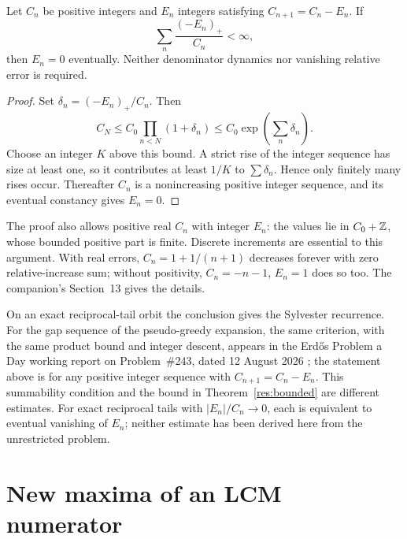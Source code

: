 \documentclass[11pt]{article}
\begin{document}
\begin{theorem}\label{res:massscalar}\label{res:mass}
Let $C_n$ be positive integers and $E_n$ integers satisfying
$C_{n+1}=C_n-E_n$. If
\[
 \sum_n\frac{(-E_n)_+}{C_n}<\infty,
\]
then $E_n=0$ eventually. Neither denominator dynamics nor vanishing relative error is required.
\end{theorem}
\begin{proof}
Set $\delta_n=(-E_n)_+/C_n$. Then
\[
 C_N\le C_0\prod_{n<N}(1+\delta_n)
 \le C_0\exp\!\left(\sum_n\delta_n\right).
\]
Choose an integer $K$ above this bound. A strict rise of the integer
sequence has size at least one, so it contributes at least $1/K$ to
$\sum\delta_n$. Hence only finitely many rises occur. Thereafter
$C_n$ is a nonincreasing positive integer sequence, and its eventual
constancy gives $E_n=0$.
\end{proof}

The proof also allows positive real $C_n$ with integer $E_n$: the values
lie in $C_0+\mathbb{Z}$, whose bounded positive part is finite. Discrete increments
are essential to this argument. With real errors, $C_n=1+1/(n+1)$
decreases forever with zero relative-increase sum; without positivity,
$C_n=-n-1$, $E_n=1$ does so too. The companion's Section~13 gives the details.

On an exact reciprocal-tail orbit the conclusion gives the Sylvester
recurrence. For the gap sequence of the pseudo-greedy expansion, the same
criterion, with the same product bound and integer descent, appears in the
Erd\H{o}s Problem a Day working report on Problem~\#243, dated 12 August 2026
\cite[``A global termination criterion'']{erdosproblemaday243}; the statement
above is for any positive integer sequence with $C_{n+1}=C_n-E_n$.
This summability condition and the bound in Theorem~\ref{res:bounded}
are different estimates. For exact reciprocal tails with $|E_n|/C_n\to0$,
each is equivalent to eventual vanishing of $E_n$; neither estimate has
been derived here from the unrestricted problem.

\section{New maxima of an LCM numerator}\label{sec:lcmrecords}
\end{document}
